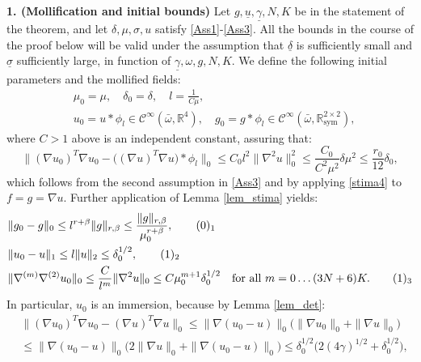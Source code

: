 \documentclass[reqno,twoside,11pt]{amsart}
\newcommand{\sym}{\mathrm{sym}}
\newcommand{\R}{\mathbb{R}}
\numberwithin{equation}{section}
\theoremstyle{plain}
\theoremstyle{definition}
\begin{document}
\bigskip


\smallskip

{\bf 1. (Mollification and initial bounds)} Let $g, \underline u, \underline\gamma,
N,K$ be in the statement of the theorem, and let
$\delta,\mu,\sigma, u$ satisfy \ref{Ass1}-\ref{Ass3}. All the
bounds in the course of the proof below will be valid under the assumption
that $\underline\delta$ is sufficiently small and $\underline\sigma$
sufficiently large, in function of $\underline\gamma, \omega, g,N,K$.
We define the following initial parameters and the mollified fields:
\begin{equation*}
\begin{split}
& \mu_0 =\mu, \quad \delta_0=\delta, \quad  l=\frac{1}{C\mu},\\
& u_0=u\ast\phi_l\in\mathcal{C}^\infty(\bar\omega,\R^4),\quad 
g_0=g\ast\phi_l\in\mathcal{C}^\infty(\bar\omega,\R^{2\times 2}_{\sym}),
\end{split}
\end{equation*}
where $C>1$ above is an independent constant, assuring that:
\begin{equation}\label{m1}
\|(\nabla u_0)^T\nabla u_0 - \big((\nabla u)^T\nabla u\big)\ast
\phi_l\|_0\leq C_0l^2\|\nabla^2u\|_0^2\leq
\frac{C_0}{C^2\mu^2}\delta\mu^2\leq \frac{r_0}{12}\delta_0,
\end{equation}
which follows from the second assumption in \ref{Ass3} and by applying \ref{stima4}
to $f=g=\nabla u$. Further application of Lemma \ref{lem_stima} yields:
\begin{align*}
& \|g_0-g\|_0\leq l^{r+\beta}\|g\|_{r,\beta}\leq \frac{\|g\|_{r,\beta}}{\mu_0^{r+\beta}},
\tag*{(\theequation)$_1$}\refstepcounter{equation} \label{m2} \\
& \|u_0-u\|_1\leq l\|u\|_2\leq \delta_0^{1/2},
\tag*{(\theequation)$_2$} \label{m3} \\
& \|\nabla^{(m)}\nabla^{(2)}u_0\|_0\leq \frac{C}{l^m}\|\nabla^2
u\|_0\leq C\mu_0^{m+1} \delta_0^{1/2} \quad\mbox{for all } m=0\ldots (3N+6)K.
\tag*{(\theequation)$_3$} \label{m4} 
\end{align*}
In particular, $u_0$ is an immersion, because by Lemma \ref{lem_det}:
\begin{equation*}
\begin{split}
&  \|(\nabla u_0)^T\nabla u_0 - (\nabla u)^T\nabla u\|_0\leq 
\|\nabla(u_0-u)\|_0\big(\|\nabla u_0\|_0 +\|\nabla u\|_0 \big)\\ & \leq
\|\nabla(u_0-u)\|_0\big(2\|\nabla u\|_0 +\|\nabla (u_0-u)\|_0 \big)\leq
\delta_0^{1/2}\big(2 (4\gamma)^{1/2} + \delta_0^{1/2}\big),
\end{split}
\end{equation*}
\end{document}
